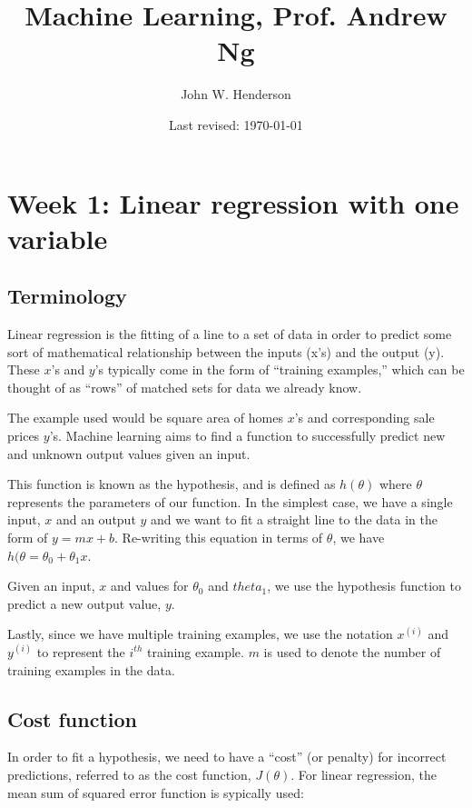 \documentclass[11pt]{article}
\title{Machine Learning, Prof. Andrew Ng}
\author{John W. Henderson}
\date{Last revised: \today}
\begin{document}
\maketitle

\setcounter{tocdepth}{4}
\tableofcontents
\vspace*{1cm}

\section{Week 1: Linear regression with one variable}
\label{sec-1}
\subsection{Terminology}
\label{sec-1-1}

Linear regression is the fitting of a line to a set of data in order to predict some
sort of mathematical relationship between the inputs (x's) and the output (y). These
\(x\)'s and \(y\)'s typically come in the form of ``training examples,'' which can be
thought of as ``rows'' of matched sets for data we already know.

The example used would be square area of homes \(x\)'s and corresponding sale prices
\(y\)'s. Machine learning aims to find a function to successfully predict new and
unknown output values given an input.

This function is known as the hypothesis, and is defined as \(h(\theta)\) where
\(\theta\) represents the parameters of our function. In the simplest case, we have a
single input, \(x\) and an output \(y\) and we want to fit a straight line to the
data in the form of \(y = mx + b\). Re-writing this equation in terms of \(\theta\),
we have \(h(\theta = \theta_0 + \theta_1 x\).

Given an input, \(x\) and values for \(\theta_0\) and \(theta_1\), we use the
hypothesis function to predict a new output value, \(y\).

Lastly, since we have multiple training examples, we use the notation \(x^{(i)}\) and
\(y^{(i)}\) to represent the \(i^{th}\) training example. \(m\) is used to denote the
number of training examples in the data.
\subsection{Cost function}
\label{sec-1-2}

In order to fit a hypothesis, we need to have a ``cost'' (or penalty) for incorrect
predictions, referred to as the cost function, \(J(\theta)\). For linear regression,
the mean sum of squared error function is sypically used:
\end{document}
